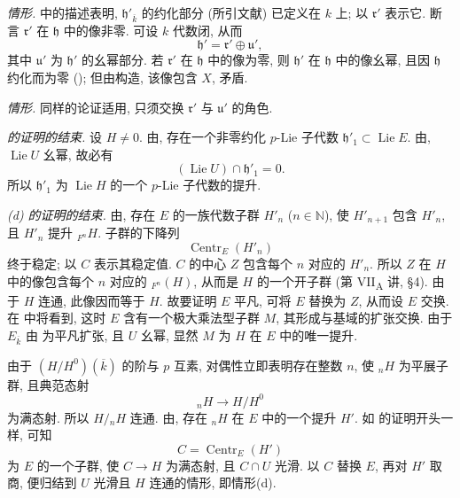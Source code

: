 \smallskip
\noindent
\emph{情形.}
 中的描述表明,
\(\mathfrak h'_{\overline{k}}\) 的约化部分 (所引文献) 已定义在 \(k\) 上;
以 \(\mathfrak r'\) 表示它. 断言 \(\mathfrak r'\) 在 \(\mathfrak h\) 中的像非零.
可设 \(k\) 代数闭, 从而
\[
  \mathfrak h'=\mathfrak r'\oplus\mathfrak u',
\]
其中 \(\mathfrak u'\) 为 \(\mathfrak h'\) 的幺幂部分.
若 \(\mathfrak r'\) 在 \(\mathfrak h\) 中的像为零,
则 \(\mathfrak h'\) 在 \(\mathfrak h\) 中的像幺幂,
且因 \(\mathfrak h\) 约化而为零 ();
但由构造, 该像包含 \(X\), 矛盾.

\smallskip
\noindent
\emph{情形.}
同样的论证适用, 只须交换 \(\mathfrak r'\) 与 \(\mathfrak u'\) 的角色.

\smallskip
\noindent
\emph{ 的证明的结束.}
设 \(H\ne0\). 由,
存在一个非零约化 \(p\)-Lie 子代数 \(\mathfrak h'_1\subset\operatorname{Lie}E\).
由, \(\operatorname{Lie}U\) 幺幂, 故必有
\[
  (\operatorname{Lie}U)\cap\mathfrak h'_1=0.
\]
所以 \(\mathfrak h'_1\) 为 \(\operatorname{Lie}H\) 的一个 \(p\)-Lie 子代数的提升.

\smallskip
\noindent
\emph{(d) 的证明的结束.}
由, 存在 \(E\) 的一族代数子群 \(H'_n\)
(\(n\in\mathbb N\)), 使 \(H'_{n+1}\) 包含 \(H'_n\), 且 \(H'_n\) 提升 \({}_{F^n}H\).
子群的下降列
\[
  \operatorname{Centr}_E(H'_n)
\]
终于稳定; 以 \(C\) 表示其稳定值.
\(C\) 的中心 \(Z\) 包含每个 \(n\) 对应的 \(H'_n\).
所以 \(Z\) 在 \(H\) 中的像包含每个 \(n\) 对应的 \({}_{F^n}(H)\),
从而是 \(H\) 的一个开子群 (第 VII\textsubscript{A} 讲, \S 4).
由于 \(H\) 连通, 此像因而等于 \(H\).
故要证明 \(E\) 平凡, 可将 \(E\) 替换为 \(Z\), 从而设 \(E\) 交换.
在 中将看到,
这时 \(E\) 含有一个极大乘法型子群 \(M\), 其形成与基域的扩张交换.
由于 \(E_{\overline{k}}\) 由
为平凡扩张, 且 \(U\) 幺幂, 显然 \(M\) 为 \(H\) 在 \(E\) 中的唯一提升.

由于 \((H/H^0)(\overline{k})\) 的阶与 \(p\) 互素,
对偶性立即表明存在整数 \(n\), 使 \({}_nH\) 为平展子群, 且典范态射
\[
  {}_nH\longrightarrow H/H^0
\]
为满态射. 所以 \(H/{}_nH\) 连通.
由,
存在 \({}_nH\) 在 \(E\) 中的一个提升 \(H'\).
如 的证明开头一样, 可知
\[
  C=\operatorname{Centr}_E(H')
\]
为 \(E\) 的一个子群, 使 \(C\longrightarrow H\) 为满态射, 且 \(C\cap U\) 光滑.
以 \(C\) 替换 \(E\), 再对 \(H'\) 取商,
便归结到 \(U\) 光滑且 \(H\) 连通的情形, 即情形(d).

